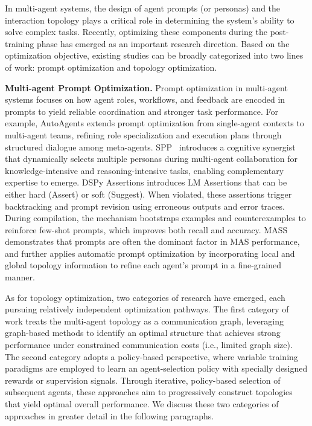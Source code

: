 In multi-agent systems, the design of agent prompts (or personas) and the interaction topology plays a critical role in determining the system’s ability to solve complex tasks. Recently, optimizing these components during the post-training phase has emerged as an important research direction. Based on the optimization objective, existing studies can be broadly categorized into two lines of work: prompt optimization and topology optimization.

\textbf{Multi-agent Prompt Optimization.} Prompt optimization in multi-agent systems focuses on how agent roles, workflows, and feedback are encoded in prompts to yield reliable coordination and stronger task performance. For example, AutoAgents \cite{chen2023autoagents} extends prompt optimization from single-agent contexts to multi-agent teams, refining role specialization and execution plans through structured dialogue among meta-agents. SPP~\cite{unleashing2024} introduces a cognitive synergist that dynamically selects multiple personas during multi-agent collaboration for knowledge-intensive and reasoning-intensive tasks, enabling complementary expertise to emerge. DSPy Assertions \cite{singhvi2023dspy} introduces LM Assertions that can be either hard (Assert) or soft (Suggest). When violated, these assertions trigger backtracking and prompt revision using erroneous outputs and error traces. During compilation, the mechanism bootstraps examples and counterexamples to reinforce few-shot prompts, which improves both recall and accuracy. MASS \cite{zhou2025multi} demonstrates that prompts are often the dominant factor in MAS performance, and further applies automatic prompt optimization \cite{pryzant2023automatic} by incorporating local and global topology information to refine each agent’s prompt in a fine-grained manner.

As for topology optimization, two categories of research have emerged, each pursuing relatively independent optimization pathways. The first category of work treats the multi-agent topology as a communication graph, leveraging graph-based methods to identify an optimal structure that achieves strong performance under constrained communication costs (i.e., limited graph size). The second category adopts a policy-based perspective, where variable training paradigms are employed to learn an agent-selection policy with specially designed rewards or supervision signals. Through iterative, policy-based selection of subsequent agents, these approaches aim to progressively construct topologies that yield optimal overall performance. We discuss these two categories of approaches in greater detail in the following paragraphs.

